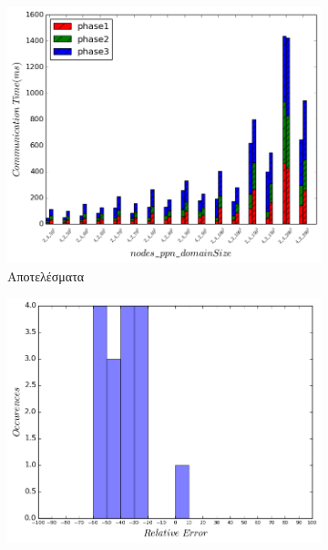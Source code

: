 \begin{figure}[ht]
    \centering
    \captionsetup{justification=centering,margin=0cm,font=footnotesize}
    \begin{subfigure}[b]{0.47\textwidth}
        \includegraphics[width=\textwidth]{./images/NB+cg_NUMA/NB_cg_lulesh_res.png}
        \caption{Αποτελέσματα}
    \end{subfigure}
    \quad %
    \begin{subfigure}[b]{0.47\textwidth}
        \includegraphics[width=\textwidth]{./images/NB+cg_NUMA/NB_cg_lulesh_err_dist.png}

\end{subfigure}
\end{figure}
